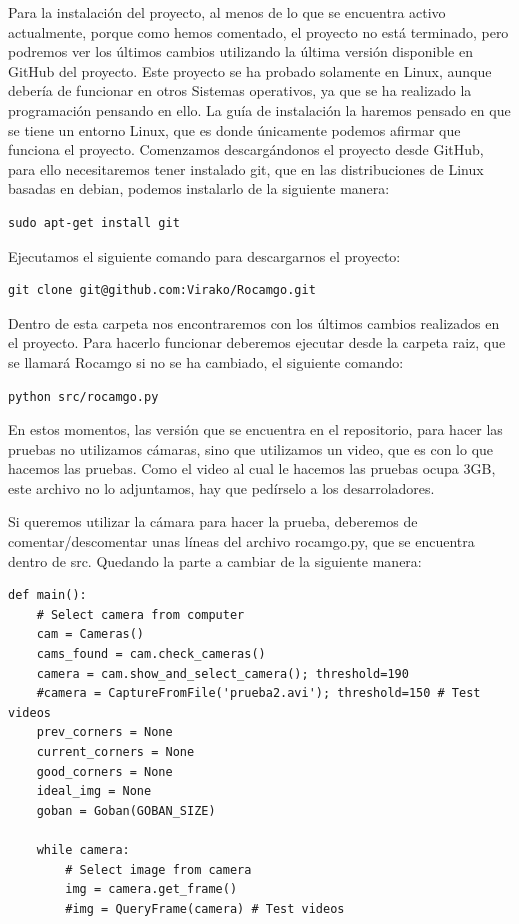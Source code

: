\documentclass[12pt,a4paper]{report}
\begin{document}
Para la instalación del proyecto, al menos de lo que se encuentra activo
actualmente, porque como hemos comentado, el proyecto no está terminado, pero
podremos ver los últimos cambios utilizando la última versión disponible en
GitHub del proyecto. Este proyecto se ha probado solamente en Linux, aunque
debería de funcionar en otros Sistemas operativos, ya que se ha realizado la
programación pensando en ello. 
La guía de instalación la haremos pensado en que se tiene un entorno Linux, que
es donde únicamente podemos afirmar que funciona el proyecto. Comenzamos
descargándonos el proyecto desde GitHub, para ello necesitaremos tener instalado
git, que en las distribuciones de Linux basadas en debian, podemos instalarlo de
la siguiente manera: 

\begin{verbatim}
sudo apt-get install git
\end{verbatim}

Ejecutamos el siguiente comando para descargarnos el proyecto: 

\begin{verbatim}
git clone git@github.com:Virako/Rocamgo.git
\end{verbatim}

Dentro de esta carpeta nos encontraremos con los últimos cambios realizados en
el proyecto. Para hacerlo funcionar deberemos ejecutar desde la carpeta raiz,
que se llamará Rocamgo si no se ha cambiado, el siguiente comando:

\begin{verbatim}
python src/rocamgo.py
\end{verbatim}

En estos momentos, las versión que se encuentra en el repositorio, para hacer
las pruebas no utilizamos cámaras, sino que utilizamos un video, que es con lo
que hacemos las pruebas. Como el video al cual le hacemos las pruebas ocupa 3GB,
este archivo no lo adjuntamos, hay que pedírselo a los desarroladores. 

Si queremos utilizar la cámara para hacer la prueba, deberemos de
comentar/descomentar unas líneas del archivo rocamgo.py, que se encuentra dentro
de src. Quedando la parte a cambiar de la siguiente manera: 

\begin{verbatim}
def main():
    # Select camera from computer
    cam = Cameras()
    cams_found = cam.check_cameras()
    camera = cam.show_and_select_camera(); threshold=190
    #camera = CaptureFromFile('prueba2.avi'); threshold=150 # Test videos
    prev_corners = None
    current_corners = None
    good_corners = None
    ideal_img = None
    goban = Goban(GOBAN_SIZE)

    while camera: 
        # Select image from camera 
        img = camera.get_frame()
        #img = QueryFrame(camera) # Test videos
\end{verbatim}
\end{document}
